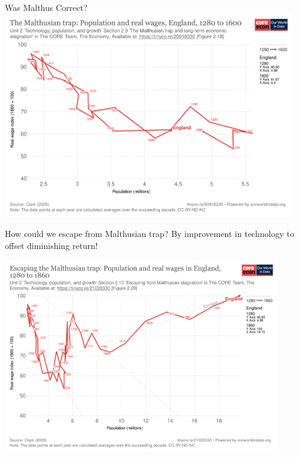 \documentclass[11pt,aspectratio=43,usenames,dvipsnames]{beamer}
\theoremstyle{definition}
\begin{document}
\begin{frame}{Was Malthus Correct?}
\label{slide:Was_Malthus_Correct_}
    \includegraphics[width=0.95\textwidth]{./figures/the-malthusian-trap.png}
\end{frame}

\begin{frame}{How could we escape from Malthusian trap?}
\label{slide:How_could_we_escape_from_Malthusian_trap_}
    By \alert{improvement in technology} to offset diminishing return!

    \begin{center}
        \includegraphics[width=0.9\textwidth]{./figures/escaping-the-malthusian-trap.png}
    \end{center}
\end{frame}
\end{document}
